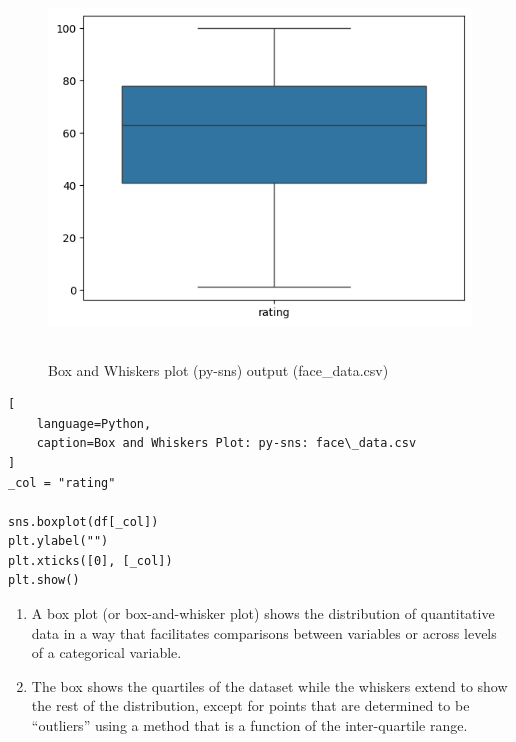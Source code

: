 \begin{table}[H]
\begin{minipage}[t]{0.35\linewidth}
\begin{figure}[H]
    \centering
    \includegraphics[width=0.9\linewidth, height=10cm, keepaspectratio]{images/data/__visualizations__/sns-box-rating-face-data.png}
    \caption{Box and Whiskers plot (py-sns) output (face\_data.csv)}
\end{figure}
\end{minipage}
\hspace{0.2cm}
\vrule width 1pt
\hspace{0.5cm}
\begin{minipage}[t]{0.57\linewidth}
\begin{lstlisting}[
    language=Python,
    caption=Box and Whiskers Plot: py-sns: face\_data.csv
]
_col = "rating"

sns.boxplot(df[_col])
plt.ylabel("")
plt.xticks([0], [_col])
plt.show()
\end{lstlisting}
\end{minipage}
\end{table}




\begin{enumerate}
    \item A box plot (or box-and-whisker plot) shows the distribution of quantitative data in a way that facilitates comparisons between variables or across levels of a categorical variable.  \hfill \cite{data/online/seaborn.boxplot}
    
    \item The box shows the quartiles of the dataset while the whiskers extend to show the rest of the distribution, except for points that are determined to be “outliers” using a method that is a function of the inter-quartile range. \hfill \cite{data/online/seaborn.boxplot}
\end{enumerate}



